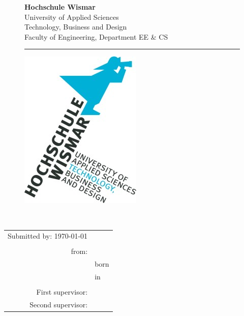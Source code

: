 \begin{titlepage}
	\setlength\headsep{-5mm}
	\begin{figure}[!h]
		\begin{minipage}{0.8\textwidth}
			\textbf{Hochschule Wismar} \\
			University of Applied Sciences \\
			Technology, Business and Design \\
			Faculty of Engineering, Department EE \&{} CS \\
		\rule{\textwidth}{0.5pt}
		\end{minipage}
		\begin{minipage}[r]{0.1\textwidth}
			\begin{flushright}
				\includegraphics[height=6\baselineskip]{pics/HSLogo.jpg}
			\end{flushright}
		\end{minipage}
	\end{figure}
	\vspace*{6cm}
	\begin{center}
		\Huge
		\textbf{\documentType} \\
		\vspace{2cm}
		\large \thetitle
		\begin{table}[b]
			\begin{tabular}{rl}
				Submitted by: \today \\
				\\
				from: & \theauthor \\
				& born \birthday \\
				& in \birthplace \\
				\\
				First supervisor: & \firstTutor \\
				Second supervisor: & \secondTutor
			\end{tabular}
		\end{table}
	\end{center}
\end{titlepage}